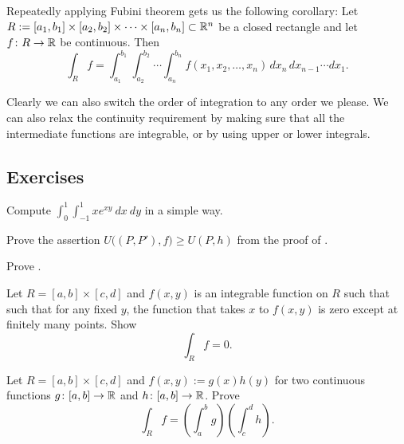 Repeatedly applying Fubini theorem gets us the following
corollary:
Let $R := [a_1,b_1] \times [a_2,b_2] \times \cdots \times [a_n,b_n] \subset
{\mathbb{R}}^n$ be a closed rectangle and let
$f \colon R \to {\mathbb{R}}$ be continuous.  Then
\begin{equation*}
\int_R f = 
\int_{a_1}^{b_1}
\int_{a_2}^{b_2}
\cdots
\int_{a_n}^{b_n}
f(x_1,x_2,\ldots,x_n)
\,
dx_n
\,
dx_{n-1}
\cdots
dx_1 .
\end{equation*}

Clearly we can also switch the order of integration to any order we please.
We can also relax the continuity requirement by making sure that all the
intermediate functions are integrable, or by using upper or lower integrals.

\subsection{Exercises}

\begin{exercise}
Compute $\int_{0}^1 \int_{-1}^1 xe^{xy} ~ dx ~ dy$ in a simple way.
\end{exercise}

\begin{exercise}
Prove the assertion
$U\bigl((P,P'),f\bigr) \geq U(P,h)$ from the proof
of .
\end{exercise}

\begin{exercise}[Easy]
Prove .
\end{exercise}

\begin{exercise}
Let $R=[a,b] \times [c,d]$ and $f(x,y)$ is an integrable
function on $R$ such that
such that for any fixed $y$, the function that takes $x$ to $f(x,y)$
is zero except at finitely many points.  Show
\begin{equation*}
\int_R f = 0 .
\end{equation*}
\end{exercise}

\begin{exercise}
Let $R=[a,b] \times [c,d]$ and $f(x,y) := g(x)h(y)$ for two continuous
functions $g \colon [a,b] \to {\mathbb{R}}$ and
$h \colon [a,b] \to {\mathbb{R}}$.  Prove
\begin{equation*}
\int_R f = \left(\int_a^b g\right)\left(\int_c^d h\right) .
\end{equation*}
\end{exercise}


